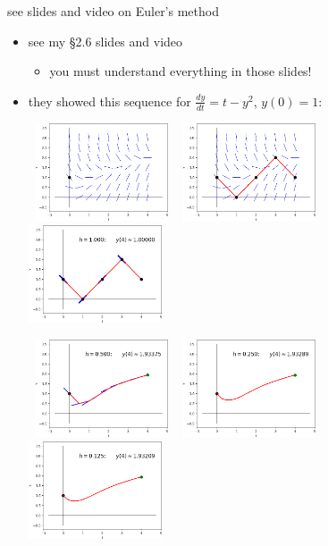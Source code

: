 \documentclass[urlcolor=blue,dvipsnames]{beamer}
\begin{document}
\begin{frame}{see slides and video on Euler's method}

\begin{itemize}
\item \alert{see my \S 2.6 slides and video}
    \begin{itemize}
    \item you must understand everything in those slides!
    \end{itemize}
\item they showed this sequence for $\frac{dy}{dt} = t - y^2$, $y(0)=1$:

\bigskip

\hspace{-12mm} \mbox{
\includegraphics[width=0.31\textwidth]{figs/sequence-1} $\,$
\includegraphics[width=0.31\textwidth]{figs/sequence-2} $\,$
\includegraphics[width=0.31\textwidth]{figs/sequence-3} $\,$
}

\bigskip

\hspace{-12mm} \mbox{
\includegraphics[width=0.31\textwidth]{figs/sequence-4} $\,$
\includegraphics[width=0.31\textwidth]{figs/sequence-5} $\,$
\includegraphics[width=0.31\textwidth]{figs/sequence-6}
}


\end{itemize}
\end{frame}
\end{document}
